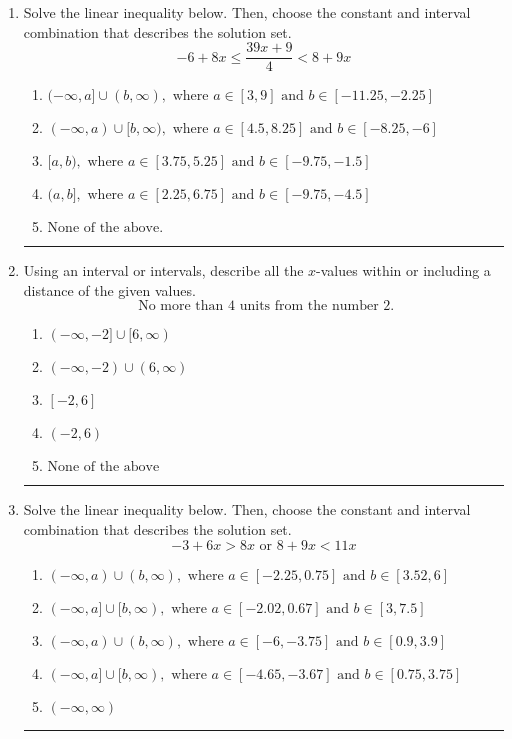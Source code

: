 \documentclass[14pt]{extbook}
\newcommand{\litem}[1]{\item#1\hspace*{-1cm}\rule{\textwidth}{0.4pt}}
\begin{document}
\begin{enumerate}
{\begin{enumerate}[label=\Alph*.]
\end{enumerate} }
\litem{
Solve the linear inequality below. Then, choose the constant and interval combination that describes the solution set.\[ -6 + 8 x \leq \frac{39 x + 9}{4} < 8 + 9 x \]\begin{enumerate}[label=\Alph*.]
\item \( (-\infty, a] \cup (b, \infty), \text{ where } a \in [3, 9] \text{ and } b \in [-11.25, -2.25] \)
\item \( (-\infty, a) \cup [b, \infty), \text{ where } a \in [4.5, 8.25] \text{ and } b \in [-8.25, -6] \)
\item \( [a, b), \text{ where } a \in [3.75, 5.25] \text{ and } b \in [-9.75, -1.5] \)
\item \( (a, b], \text{ where } a \in [2.25, 6.75] \text{ and } b \in [-9.75, -4.5] \)
\item \( \text{None of the above.} \)

\end{enumerate} }
\litem{
Using an interval or intervals, describe all the $x$-values within or including a distance of the given values.\[ \text{ No more than } 4 \text{ units from the number } 2. \]\begin{enumerate}[label=\Alph*.]
\item \( (-\infty, -2] \cup [6, \infty) \)
\item \( (-\infty, -2) \cup (6, \infty) \)
\item \( [-2, 6] \)
\item \( (-2, 6) \)
\item \( \text{None of the above} \)

\end{enumerate} }
\litem{
Solve the linear inequality below. Then, choose the constant and interval combination that describes the solution set.\[ -3 + 6 x > 8 x \text{ or } 8 + 9 x < 11 x \]\begin{enumerate}[label=\Alph*.]
\item \( (-\infty, a) \cup (b, \infty), \text{ where } a \in [-2.25, 0.75] \text{ and } b \in [3.52, 6] \)
\item \( (-\infty, a] \cup [b, \infty), \text{ where } a \in [-2.02, 0.67] \text{ and } b \in [3, 7.5] \)
\item \( (-\infty, a) \cup (b, \infty), \text{ where } a \in [-6, -3.75] \text{ and } b \in [0.9, 3.9] \)
\item \( (-\infty, a] \cup [b, \infty), \text{ where } a \in [-4.65, -3.67] \text{ and } b \in [0.75, 3.75] \)
\item \( (-\infty, \infty) \)


\end{enumerate}}
\end{enumerate}
\end{document}
